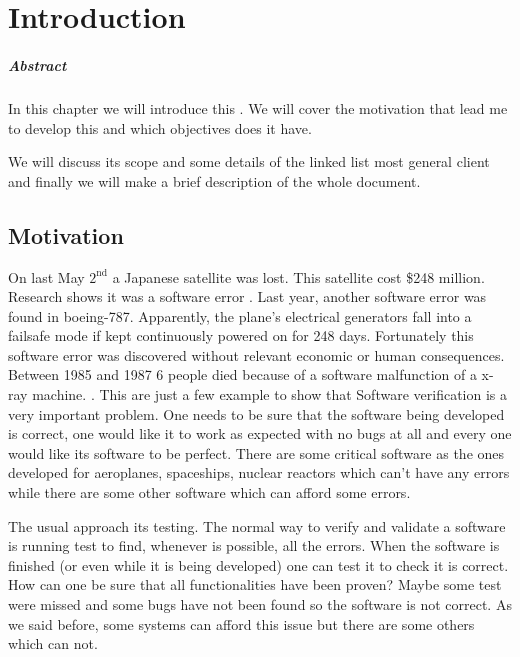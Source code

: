 \chapter{Introduction\label{chap:introduction}}

\paragraph{Abstract}

In this chapter we will introduce this \thisworkm. We will cover the motivation that lead me to develop this \thisworkm and which objectives does it have.

We will discuss its scope and some details of the linked list most general client and finally we will make a brief description of the whole document. 

\section{Motivation}

\label{Motivation}
On last May $\text{2}^{\text{nd}}$ a Japanese satellite was lost. This satellite cost \$248 million.
%
Research shows it was a software error \cite{japaneseSatellite}. 
%
Last year, another software error was found in boeing-787.
%
Apparently, the plane’s electrical generators fall into a failsafe mode if kept continuously powered on for 248 days. \cite{boein787}
%
Fortunately this software error was discovered without relevant economic or human consequences.
%
Between 1985 and 1987 6 people died because of a software malfunction of a x-ray machine. \cite{xraykill}.
%
This are just a few example to show that Software verification is a very important problem.
%
One needs to be sure that the software being developed is correct, one would like it to work as expected with no bugs at all and every one would like its software to be perfect.
%
There are some critical software as the ones developed for aeroplanes, spaceships, nuclear reactors which can't have any errors while there are some other software which can afford some errors.


The usual approach its testing.
% 
The normal way to verify and validate a software is running test to find, whenever is possible, all the errors.
% 
When the software is finished (or even while it is being developed) one can test it to check it is correct.
%
How can one be sure that all functionalities have been proven? Maybe some test were missed and some bugs have not been found so the software is not correct.
%
As we said before, some systems can afford this issue but there are some others which can not.


